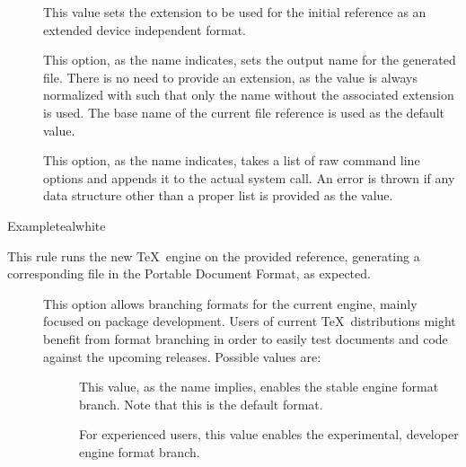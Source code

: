 \begin{description}
\begin{description}
\item[] This value sets the extension to be used for the initial reference as an extended device independent format.
\end{description}

\begin{description}
\item[] This option, as the name indicates, sets the output name for the generated  file. There is no need to provide an extension, as the value is always normalized with  such that only the name without the associated extension is used. The base name of the current file reference is used as the default value.

\item[] This option, as the name indicates, takes a list of raw command line options and appends it to the actual system call. An error is thrown if any data structure other than a proper list is provided as the value.
\end{description}

\begin{codebox}{Example}{teal}{\icnote}{white}
\end{codebox}

\item[\rulebox{xelatex}]
This rule runs the new  \TeX\ engine on the provided  reference, generating a corresponding file in the Portable Document Format, as expected.

\begin{description}
\item[] This option allows branching formats for the current engine, mainly focused on package development. Users of current \TeX\ distributions might benefit from format branching in order to easily test documents and code against the upcoming releases. Possible values are:

\begin{description}
\item[] This value, as the name implies, enables the stable engine format branch. Note that this is the default format.

\item[] For experienced users, this value enables the experimental, developer engine format branch.
\end{description}


\end{description}
\end{description}
